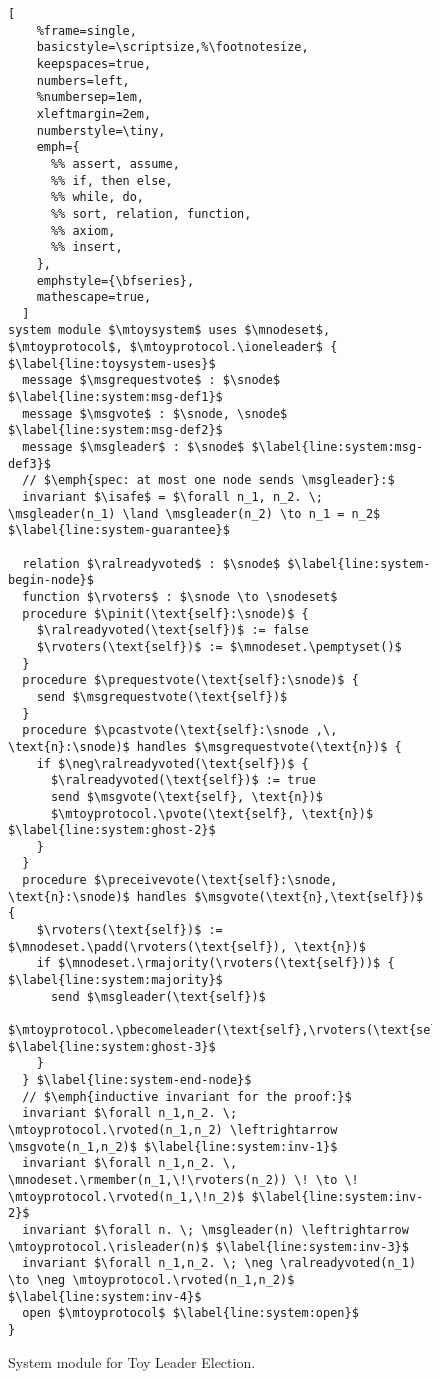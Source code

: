 \begin{figure}
\begin{lstlisting}[
    %frame=single,
    basicstyle=\scriptsize,%\footnotesize,
    keepspaces=true,
    numbers=left,
    %numbersep=1em,
    xleftmargin=2em,
    numberstyle=\tiny,
    emph={
      %% assert, assume,
      %% if, then else,
      %% while, do,
      %% sort, relation, function,
      %% axiom,
      %% insert,
    },
    emphstyle={\bfseries},
    mathescape=true,
  ]
system module $\mtoysystem$ uses $\mnodeset$, $\mtoyprotocol$, $\mtoyprotocol.\ioneleader$ { $\label{line:toysystem-uses}$
  message $\msgrequestvote$ : $\snode$  $\label{line:system:msg-def1}$
  message $\msgvote$ : $\snode, \snode$ $\label{line:system:msg-def2}$
  message $\msgleader$ : $\snode$ $\label{line:system:msg-def3}$
  // $\emph{spec: at most one node sends \msgleader}:$
  invariant $\isafe$ = $\forall n_1, n_2. \; \msgleader(n_1) \land \msgleader(n_2) \to n_1 = n_2$ $\label{line:system-guarantee}$

  relation $\ralreadyvoted$ : $\snode$ $\label{line:system-begin-node}$
  function $\rvoters$ : $\snode \to \snodeset$
  procedure $\pinit(\text{self}:\snode)$ {
    $\ralreadyvoted(\text{self})$ := false
    $\rvoters(\text{self})$ := $\mnodeset.\pemptyset()$
  }
  procedure $\prequestvote(\text{self}:\snode)$ {
    send $\msgrequestvote(\text{self})$
  }
  procedure $\pcastvote(\text{self}:\snode ,\, \text{n}:\snode)$ handles $\msgrequestvote(\text{n})$ {
    if $\neg\ralreadyvoted(\text{self})$ {
      $\ralreadyvoted(\text{self})$ := true
      send $\msgvote(\text{self}, \text{n})$
      $\mtoyprotocol.\pvote(\text{self}, \text{n})$ $\label{line:system:ghost-2}$
    }
  }
  procedure $\preceivevote(\text{self}:\snode, \text{n}:\snode)$ handles $\msgvote(\text{n},\text{self})$ {
    $\rvoters(\text{self})$ := $\mnodeset.\padd(\rvoters(\text{self}), \text{n})$
    if $\mnodeset.\rmajority(\rvoters(\text{self}))$ { $\label{line:system:majority}$
      send $\msgleader(\text{self})$
      $\mtoyprotocol.\pbecomeleader(\text{self},\rvoters(\text{self}))$ $\label{line:system:ghost-3}$
    }
  } $\label{line:system-end-node}$
  // $\emph{inductive invariant for the proof:}$
  invariant $\forall n_1,n_2. \; \mtoyprotocol.\rvoted(n_1,n_2) \leftrightarrow \msgvote(n_1,n_2)$ $\label{line:system:inv-1}$
  invariant $\forall n_1,n_2. \, \mnodeset.\rmember(n_1,\!\rvoters(n_2)) \! \to \! \mtoyprotocol.\rvoted(n_1,\!n_2)$ $\label{line:system:inv-2}$
  invariant $\forall n. \; \msgleader(n) \leftrightarrow \mtoyprotocol.\risleader(n)$ $\label{line:system:inv-3}$
  invariant $\forall n_1,n_2. \; \neg \ralreadyvoted(n_1) \to \neg \mtoyprotocol.\rvoted(n_1,n_2)$ $\label{line:system:inv-4}$
  open $\mtoyprotocol$ $\label{line:system:open}$
}
\end{lstlisting}
\caption{\label{fig:toysystem}System module for Toy Leader Election. }
\end{figure}
